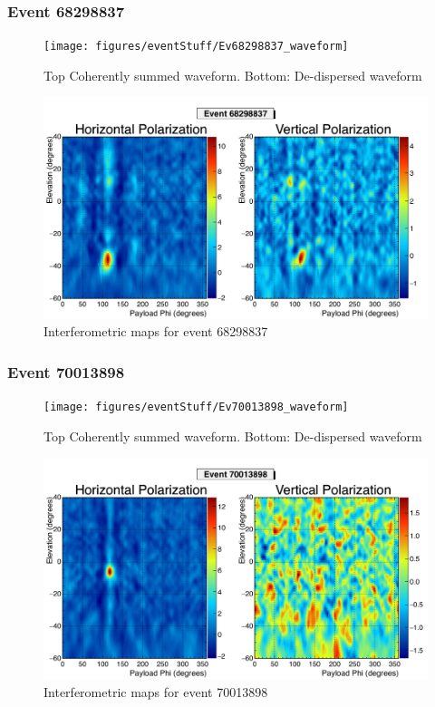 		\subsubsection{Event 68298837}
		\begin{figure}
		\centering
			\texttt{[image: figures/eventStuff/Ev68298837\_waveform]}
			\caption{Top Coherently summed waveform.  Bottom: De-dispersed waveform} 
		\label{fig:Ev68298837_waveform}
		\end{figure}
		
		\begin{figure}
		\centering
			\includegraphics[width=\textwidth]{figures/intMap/intMap_ev68298837}
			\caption{Interferometric maps for event 68298837} 
		\label{fig:Ev68298837_map}
		\end{figure}			
	
		\subsubsection{Event 70013898}
		\begin{figure}
		\centering
			\texttt{[image: figures/eventStuff/Ev70013898\_waveform]}
			\caption{Top Coherently summed waveform.  Bottom: De-dispersed waveform} 
		\label{fig:Ev70013898_waveform}
		\end{figure}
		
		\begin{figure}
		\centering
			\includegraphics[width=\textwidth]{figures/intMap/intMap_ev70013898}
			\caption{Interferometric maps for event 70013898} 
		\label{fig:Ev70013898_map}
		\end{figure}			
	
